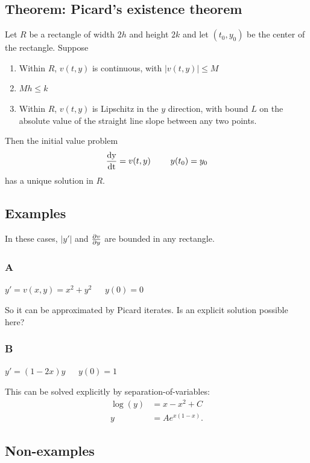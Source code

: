 \subsection{Theorem: Picard's existence theorem}
\begin{mdframed}
Let $R$ be a rectangle of width $2h$ and height $2k$ and let
$(t_0, y_0)$ be the center of the rectangle. Suppose
\begin{enumerate}
\item Within $R$, $v(t, y)$ is continuous, with $|v(t, y)| \leq M$
\item $Mh \leq k$
\item Within $R$, $v(t, y)$ is Lipschitz in the $y$ direction, with bound $L$
  on the absolute value of the straight line slope between any two points.
\end{enumerate}

Then the initial value problem
\begin{align*}
  \frac{\operatorname{\text{dy}}}{\operatorname{\text{dt}}} = v(t, y) ~~~~~~~ y(t_0) = y_0
\end{align*}
has a unique solution in $R$.
\end{mdframed}

\subsection{Examples}

In these cases, $|y'|$ and $\frac{\partial v}{\partial y}$ are bounded in any rectangle.

\subsubsection{A}
$y' = v(x, y) = x^2 + y^2 ~~~~~~~ y(0) = 0$

So it can be approximated by Picard iterates. Is an explicit solution possible here?

\subsubsection{B}
$y' = (1 - 2x)y ~~~~~~~ y(0) = 1$

This can be solved explicitly by separation-of-variables:
\begin{align*}
  \log(y) &= x- x^2 + C\\
  y       &= Ae^{x(1-x)}.
\end{align*}


\subsection{Non-examples}

